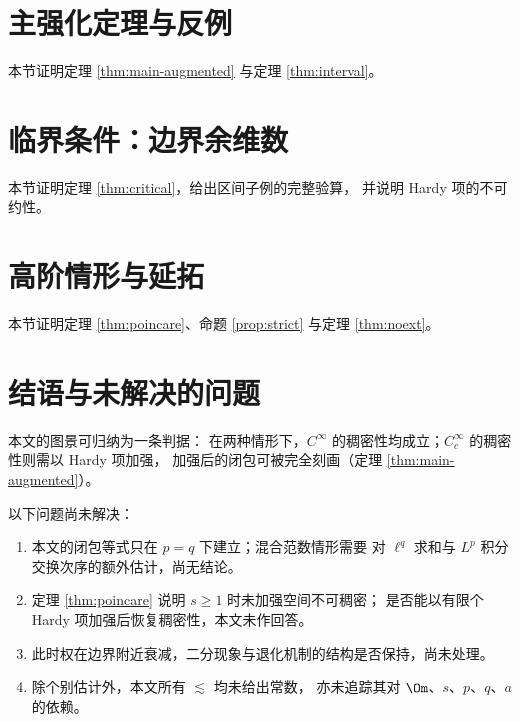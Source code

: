 \section{主强化定理与反例}\label{s5}

本节证明定理 \ref{thm:main-augmented} 与定理 \ref{thm:interval}。



\section{临界条件：边界余维数}\label{s6}

本节证明定理 \ref{thm:critical}，给出区间子例的完整验算，
并说明 Hardy 项的不可约性。



\section{高阶情形与延拓}\label{s7}

本节证明定理 \ref{thm:poincare}、命题 \ref{prop:strict} 与定理 \ref{thm:noext}。





\section{结语与未解决的问题}\label{s8}

本文的图景可归纳为一条判据：
在两种情形下，$C^\infty$ 的稠密性均成立；$C_c^\infty$ 的稠密性则需以 Hardy 项加强，
加强后的闭包可被完全刻画（定理 \ref{thm:main-augmented}）。

以下问题尚未解决：
\begin{enumerate}[label=(\arabic*)]
  \item {} 本文的闭包等式只在 $p=q$ 下建立；混合范数情形需要
        对 $\ell^q$ 求和与 $L^p$ 积分交换次序的额外估计，尚无结论。
  \item {} 定理 \ref{thm:poincare} 说明 $s\ge1$ 时未加强空间不可稠密；
        是否能以有限个 Hardy 项加强后恢复稠密性，本文未作回答。
  \item {} 此时权在边界附近衰减，二分现象与退化机制的结构是否保持，尚未处理。
  \item {} 除个别估计外，本文所有 $\lesssim$ 均未给出常数，
        亦未追踪其对 $\Om$、$s$、$p$、$q$、$a$ 的依赖。
\end{enumerate}

